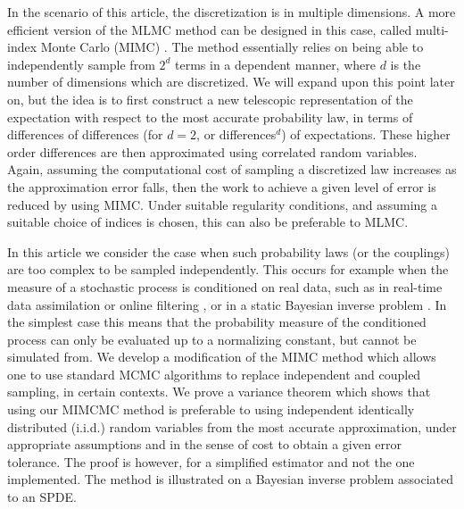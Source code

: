 \documentclass[english]{article}
\begin{document}
In the scenario of this article, the discretization is in multiple dimensions. 
A more efficient version of the MLMC method can be designed in this case, 
called multi-index Monte Carlo (MIMC) \cite{mimc}. 
The method essentially relies on being able to independently sample 
from $2^d$ terms %
in a dependent manner, where $d$ is the number of dimensions which are discretized. 
We will expand upon this point later on,
but the idea is to first construct a new telescopic representation of the expectation 
with respect to the most accurate probability law, in terms of
differences of differences (for $d=2$, or differences$^d$) of expectations. 
These higher order differences are then approximated using correlated random variables. 
Again, assuming the computational cost of sampling a discretized law increases as the approximation error falls, then  %
the work to achieve a given level of error is reduced by using MIMC.
Under suitable regularity conditions, and assuming a suitable choice of indices is chosen,
this can also be preferable to MLMC.

In this article we consider the case when such probability laws (or the couplings) 
are too complex to be sampled independently. 
This occurs for example when the measure of a stochastic process
is conditioned on real data, such as in real-time data assimilation \cite{law2015data} 
or online filtering \cite{llospis}, or in a static Bayesian inverse problem 
\cite{stuart2010inverse, hoang2014determining}.
In the simplest case this means that the probability
measure of the conditioned process can only be evaluated up to a normalizing constant,
but cannot be simulated from.
We develop a modification of the MIMC method which allows one to use standard MCMC algorithms to replace independent and coupled sampling, in certain contexts. 
We prove a variance theorem which shows that using
our MIMCMC method is preferable to using independent identically distributed (i.i.d.) 
random variables from the most accurate approximation, under appropriate assumptions
and in the sense of cost to obtain a given error tolerance. The proof is however, for a simplified estimator
and not the one implemented. 
The method is illustrated on a Bayesian inverse problem associated to an SPDE.
\end{document}
